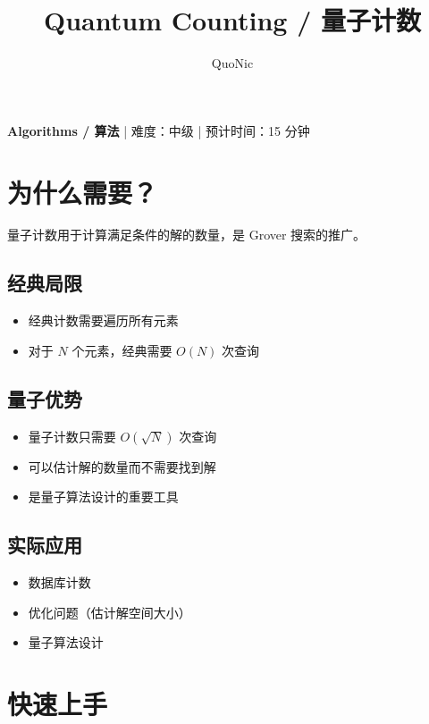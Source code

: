 \documentclass[12pt,a4paper]{article}
\title{Quantum Counting / 量子计数}
\author{QuoNic}
\date{}
\begin{document}
\maketitle

\begin{center}
\textbf{Algorithms / 算法} | 难度：中级 | 预计时间：15 分钟
\end{center}

\tableofcontents
\newpage

\section{为什么需要？}

量子计数用于计算满足条件的解的数量，是 Grover 搜索的推广。

\subsection{经典局限}
\begin{itemize}
  \item 经典计数需要遍历所有元素
  \item 对于 $N$ 个元素，经典需要 $O(N)$ 次查询
\end{itemize}

\subsection{量子优势}
\begin{itemize}
  \item 量子计数只需要 $O(\sqrt{N})$ 次查询
  \item 可以估计解的数量而不需要找到解
  \item 是量子算法设计的重要工具
\end{itemize}

\subsection{实际应用}
\begin{itemize}
  \item 数据库计数
  \item 优化问题（估计解空间大小）
  \item 量子算法设计
\end{itemize}

\section{快速上手}
\end{document}
